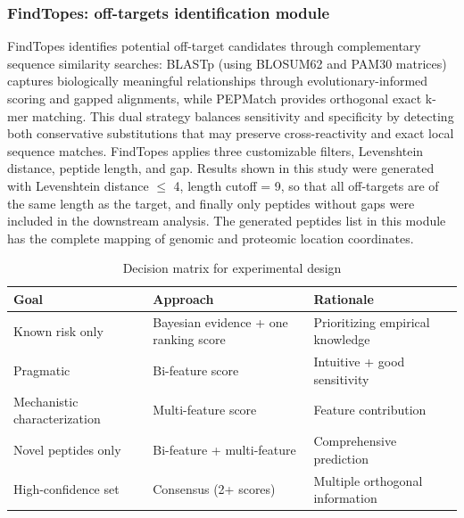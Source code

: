 \documentclass[times, twoside, watermark]{zHenriquesLab-StyleBioRxiv}
\begin{document}
        \subsubsection{FindTopes: off-targets identification module}\label{methods:findtopes} 
            FindTopes identifies potential off-target candidates through complementary sequence similarity searches: BLASTp \cite{mahram2015ncbi}(using BLOSUM62 and PAM30 matrices) captures biologically meaningful relationships through evolutionary-informed scoring and gapped alignments, while PEPMatch \cite{marrama2023pepmatch} provides orthogonal exact k-mer matching. This dual strategy balances sensitivity and specificity by detecting both conservative substitutions that may preserve cross-reactivity and exact local sequence matches. 
            FindTopes applies three customizable filters, Levenshtein distance, peptide length, and gap. Results shown in this study were generated with Levenshtein distance $\leq$ 4, length cutoff = 9, so that all off-targets are of the same length as the target, and finally only peptides without gaps were included in the downstream analysis. 
            The generated peptides list in this module has the complete mapping of genomic and proteomic location coordinates.
        \begin{table}%
        \centering
        \caption{Decision matrix for experimental design\label{tab:decisionmatrix}}
        \begin{tabular}{@{}l|l|l@{}}
            \toprule
            Goal & Approach & Rationale \\
            \midrule
            Known risk only & Bayesian evidence + one ranking score & Prioritizing empirical knowledge  \\
            Pragmatic       & Bi-feature score                      & Intuitive + good sensitivity \\
            Mechanistic characterization    & Multi-feature score   & Feature contribution \\
            Novel peptides only & Bi-feature + multi-feature        & Comprehensive prediction \\
            High-confidence set & Consensus (2+ scores)             & Multiple orthogonal information \\
            \bottomrule
        \end{tabular}
        \end{table}    
        
\end{document}
